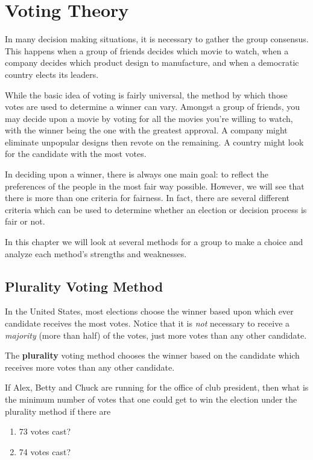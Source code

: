\chapter{Voting Theory}%
\label{chap:voting-theory}

In many decision making situations, it is necessary to gather the
group consensus. This happens when a group of friends decides which
movie to watch, when a company decides which product design to
manufacture, and when a democratic country elects its leaders.

While the basic idea of voting is fairly universal, the method by
which those votes are used to determine a winner can vary. Amongst a
group of friends, you may decide upon a movie by voting for all the
movies you're willing to watch, with the winner being the one with the
greatest approval. A company might eliminate unpopular designs then
revote on the remaining. A country might look for the candidate with
the most votes.

In deciding upon a winner, there is always one main goal: to reflect
the preferences of the people in the most fair way possible. However,
we will see that there is more than one criteria for fairness. In
fact, there are several different criteria which can be used to
determine whether an election or decision process is fair or not.

In this chapter we will look at several methods for a group to make a
choice and analyze each method's strengths and weaknesses.

\section{Plurality Voting Method}%
\label{sec:plurality-method}

In the United States, most elections choose the winner based upon
which ever candidate receives the most votes. Notice that it is
\emph{not} necessary to receive a \emph{majority} (more than half) of
the votes, just more votes than any other candidate.

\begin{definition}
  The \textbf{plurality} voting method chooses the winner based on the
  candidate which receives more votes than any other candidate.
\end{definition}

\newpage

\begin{exercise}
  If Alex, Betty and Chuck are running for the office of club
  president, then what is the minimum number of votes that one could
  get to win the election under the plurality method if there are
  \begin{enumerate}
  \item 73 votes cast?
  \item 74 votes cast?
  \end{enumerate}
\end{exercise}

